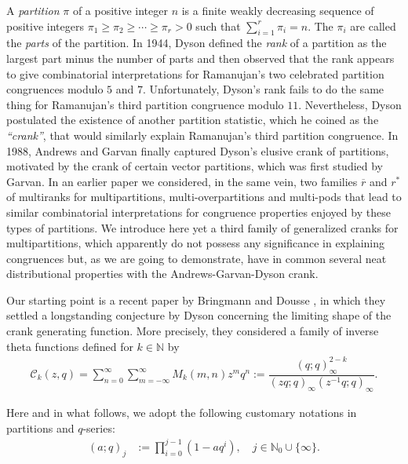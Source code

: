 \documentclass[12pt]{amsart}
\numberwithin{equation}{section}
\theoremstyle{plain}
\theoremstyle{definition}
\begin{document}
A \emph{partition} \cite{Andr2} $\pi$ of a positive integer $n$ is a finite weakly decreasing sequence of positive integers $\pi_{1}\geq\pi_{2}\geq\cdots\geq\pi_{r}>0$ such that $\sum_{i=1}^{r}\pi_{i}=n$. The $\pi_{i}$ are called the \emph{parts} of the partition. In 1944, Dyson \cite{Dys} defined the \emph{rank} of a partition as the largest part minus the number of parts and then observed that the rank appears to give combinatorial interpretations for Ramanujan's two celebrated partition congruences modulo $5$ and $7$. Unfortunately, Dyson's rank fails to do the same thing for Ramanujan's third partition congruence modulo $11$. Nevertheless, Dyson \cite{Dys} postulated the existence of another partition statistic, which he coined as the \emph{``crank''}, that would similarly explain Ramanujan's third partition
congruence. In 1988, Andrews and Garvan \cite{A-G} finally captured Dyson's elusive crank of partitions, motivated by the crank of certain vector partitions, which was first studied by Garvan\cite{Gar1}. In an earlier paper \cite{FT} we considered, in the same vein, two families $\overline{r}$ and $r^*$ of multiranks for multipartitions, multi-overpartitions and multi-pods that lead to similar combinatorial interpretations for congruence properties enjoyed by these types of partitions. We introduce here yet a third family of generalized cranks for multipartitions, which apparently do not possess any significance in explaining congruences but, as we are going to demonstrate, have in common several neat distributional properties with the Andrews-Garvan-Dyson crank.

Our starting point is a recent paper by Bringmann and Dousse \cite{BD}, in which they settled a longstanding conjecture by Dyson \cite[p.~172]{Dys2} concerning the limiting shape of the crank generating function. More precisely, they considered a family of inverse theta functions defined for $k\in\mathbb{N}$ by
\begin{align}\label{gf:k colored part crank}
\mathcal{C}_{k}(z,q)=\sum_{n=0}^{\infty}\sum_{m=-\infty}^{\infty}M_{k}(m,n)z^{m}q^{n}:=\dfrac{(q;q)_{\infty}^{2-k}}{(zq;q)_{\infty}(z^{-1}q;q)_{\infty}}.
\end{align}

Here and in what follows, we adopt the following customary notations \cite{Andr2} in partitions and $q$-series:
\begin{align*}
(a;q)_{j} &:=\prod_{i=0}^{j-1}(1-aq^{i}), \quad j\in\mathbb{N}_0\cup\{\infty\}.
\end{align*}
\end{document}
